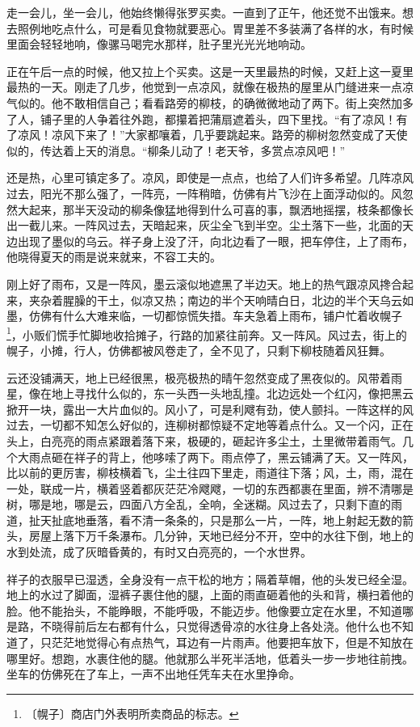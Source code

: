 \documentclass[12pt,UTF-8,openany]{ctexbook}
\begin{document}
\begin{normalsize}
    走一会儿，坐一会儿，他始终懒得张罗买卖。一直到了正午，他还觉不出饿来。想去照例地吃点什么，可是看见食物就要恶心。胃里差不多装满了各样的水，有时候里面会轻轻地响，像骡马喝完水那样，肚子里光光光地响动。
    
    正在午后一点的时候，他又拉上个买卖。这是一天里最热的时候，又赶上这一夏里最热的一天。刚走了几步，他觉到一点凉风，就像在极热的屋里从门缝进来一点凉气似的。他不敢相信自己；看看路旁的柳枝，的确微微地动了两下。街上突然加多了人，铺子里的人争着往外跑，都攥着把蒲扇遮着头，四下里找。“有了凉风！有了凉风！凉风下来了！”大家都嚷着，几乎要跳起来。路旁的柳树忽然变成了天使似的，传达着上天的消息。“柳条儿动了！老天爷，多赏点凉风吧！”
    
    还是热，心里可镇定多了。凉风，即使是一点点，也给了人们许多希望。几阵凉风过去，阳光不那么强了，一阵亮，一阵稍暗，仿佛有片飞沙在上面浮动似的。风忽然大起来，那半天没动的柳条像猛地得到什么可喜的事，飘洒地摇摆，枝条都像长出一截儿来。一阵风过去，天暗起来，灰尘全飞到半空。尘土落下一些，北面的天边出现了墨似的乌云。祥子身上没了汗，向北边看了一眼，把车停住，上了雨布，他晓得夏天的雨是说来就来，不容工夫的。
    
    刚上好了雨布，又是一阵风，墨云滚似地遮黑了半边天。地上的热气跟凉风搀合起来，夹杂着腥臊的干土，似凉又热；南边的半个天响晴白日，北边的半个天乌云如墨，仿佛有什么大难来临，一切都惊慌失措。车夫急着上雨布，铺户忙着收幌子\footnote{〔幌子〕商店门外表明所卖商品的标志。}，小贩们慌手忙脚地收拾摊子，行路的加紧往前奔。又一阵风。风过去，街上的幌子，小摊，行人，仿佛都被风卷走了，全不见了，只剩下柳枝随着风狂舞。
    
    云还没铺满天，地上已经很黑，极亮极热的晴午忽然变成了黑夜似的。风带着雨星，像在地上寻找什么似的，东一头西一头地乱撞。北边远处一个红闪，像把黑云掀开一块，露出一大片血似的。风小了，可是利飕有劲，使人颤抖。一阵这样的风过去，一切都不知怎么好似的，连柳树都惊疑不定地等着点什么。又一个闪，正在头上，白亮亮的雨点紧跟着落下来，极硬的，砸起许多尘土，土里微带着雨气。几个大雨点砸在祥子的背上，他哆嗦了两下。雨点停了，黑云铺满了天。又一阵风，比以前的更厉害，柳枝横着飞，尘土往四下里走，雨道往下落；风，土，雨，混在一处，联成一片，横着竖着都灰茫茫冷飕飕，一切的东西都裹在里面，辨不清哪是树，哪是地，哪是云，四面八方全乱，全响，全迷糊。风过去了，只剩下直的雨道，扯天扯底地垂落，看不清一条条的，只是那么一片，一阵，地上射起无数的箭头，房屋上落下万千条瀑布。几分钟，天地已经分不开，空中的水往下倒，地上的水到处流，成了灰暗昏黄的，有时又白亮亮的，一个水世界。
    
    祥子的衣服早已湿透，全身没有一点干松的地方；隔着草帽，他的头发已经全湿。地上的水过了脚面，湿裤子裹住他的腿，上面的雨直砸着他的头和背，横扫着他的脸。他不能抬头，不能睁眼，不能呼吸，不能迈步。他像要立定在水里，不知道哪是路，不晓得前后左右都有什么，只觉得透骨凉的水往身上各处浇。他什么也不知道了，只茫茫地觉得心有点热气，耳边有一片雨声。他要把车放下，但是不知放在哪里好。想跑，水裹住他的腿。他就那么半死半活地，低着头一步一步地往前拽。坐车的仿佛死在了车上，一声不出地任凭车夫在水里挣命。
    

\end{normalsize}
\end{document}
